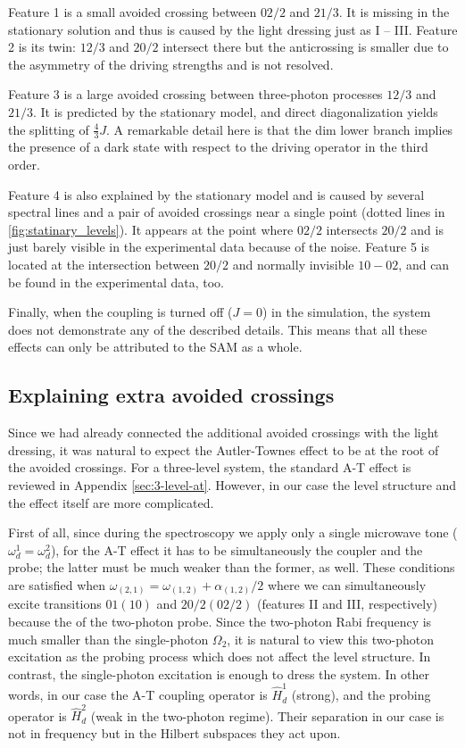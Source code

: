 \documentclass[%
 aip,
 amsmath,amssymb,
 reprint,%
]{revtex4-1}
\begin{document}
Feature 1 is a small avoided crossing between ${02/2}$ and ${21/3}$. It is missing in the stationary solution and thus is caused by the light dressing just as I -- III. Feature 2 is its twin: ${12/3}$ and ${20/2}$ intersect there but the anticrossing is smaller due to the asymmetry of the driving strengths and is not resolved. 

Feature 3 is a large avoided crossing between three-photon processes ${12/3}$ and ${21/3}$. It is predicted by the stationary model, and direct diagonalization yields the splitting of $\frac{4}{3}J$. A remarkable detail here is that the dim lower branch implies the presence of a dark state with respect to the driving operator in the third order. 

Feature 4 is also explained by the stationary model and is caused by several spectral lines and a pair of avoided crossings near a single point (dotted lines in \autoref{fig:statinary_levels}). It appears at the point where ${02/2}$ intersects ${20/2}$ and is just barely visible in the experimental data because of the noise. Feature 5 is located at the intersection between ${20/2}$ and normally invisible ${10} - {02}$, and can be found in the experimental data, too. 

Finally, when the coupling is turned off ($J=0$) in the simulation, the system does not demonstrate any of the described details. This means that all these effects can only be attributed to the SAM as a whole. 

\subsection{Explaining extra avoided crossings}\label{sec:theory}

Since we had already connected the additional avoided crossings with the light dressing, it was natural to expect the Autler-Townes effect to be at the root of the avoided crossings. For a three-level system, the standard A-T effect is reviewed in Appendix \ref{sec:3-level-at}. However, in our case the level structure and the effect itself are more complicated. 

First of all, since during the spectroscopy we apply only a single microwave tone ($\omega_d^1 = \omega_d^2$), for the A-T effect it has to be simultaneously the coupler and the probe; the latter must be much weaker than the former, as well. These conditions are satisfied when $\omega_{(2,1)} = \omega_{(1,2)}+\alpha_{(1,2)}/2$  where we can simultaneously excite transitions $01 (10)$ and $20/2 (02/2)$ (features II and III, respectively) because the of the two-photon probe. Since the two-photon Rabi frequency is much smaller than the single-photon $\Omega_2$, it is natural to view this two-photon excitation as the probing process which does not affect the level structure. In contrast, the single-photon excitation is enough to dress the system. In other words, in our case the A-T coupling operator is $\hat H_{d}^1$ (strong), and the probing operator is $\hat H_{d}^2$ (weak in the two-photon regime). Their separation in our case is not in frequency but in the Hilbert subspaces they act upon.
\end{document}

